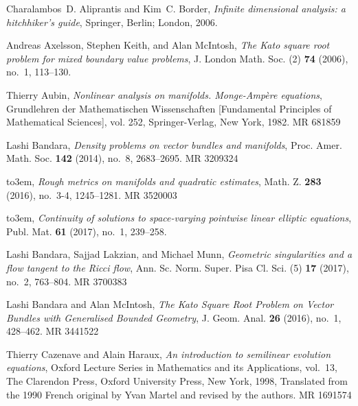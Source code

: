 \providecommand{\bysame}{\leavevmode\hbox to3em{\hrulefill}\thinspace}
\providecommand{\MR}{\relax\ifhmode\unskip\space\fi MR }
\providecommand{\MRhref}[2]{%
  \href{http://www.ams.org/mathscinet-getitem?mr=#1}{#2}
}
\providecommand{\href}[2]{#2}
\begin{thebibliography}{AKM06}

Charalambos~D. Aliprantis and Kim~C. Border, \emph{Infinite dimensional
  analysis: a hitchhiker's guide}, Springer, Berlin; London, 2006.

Andreas Axelsson, Stephen Keith, and Alan McIntosh, \emph{The {K}ato square
  root problem for mixed boundary value problems}, J. London Math. Soc. (2)
  \textbf{74} (2006), no.~1, 113--130.

Thierry Aubin, \emph{Nonlinear analysis on manifolds. {M}onge-{A}mp\`ere
  equations}, Grundlehren der Mathematischen Wissenschaften [Fundamental
  Principles of Mathematical Sciences], vol. 252, Springer-Verlag, New York,
  1982. \MR{681859}

Lashi Bandara, \emph{Density problems on vector bundles and manifolds}, Proc.
  Amer. Math. Soc. \textbf{142} (2014), no.~8, 2683--2695. \MR{3209324}

\bysame, \emph{Rough metrics on manifolds and quadratic estimates}, Math. Z.
  \textbf{283} (2016), no.~3-4, 1245--1281. \MR{3520003}

\bysame, \emph{Continuity of solutions to space-varying pointwise linear
  elliptic equations}, Publ. Mat. \textbf{61} (2017), no.~1, 239--258.

Lashi Bandara, Sajjad Lakzian, and Michael Munn, \emph{Geometric singularities
  and a flow tangent to the {R}icci flow}, Ann. Sc. Norm. Super. Pisa Cl. Sci.
  (5) \textbf{17} (2017), no.~2, 763--804. \MR{3700383}

Lashi Bandara and Alan McIntosh, \emph{The {K}ato {S}quare {R}oot {P}roblem on
  {V}ector {B}undles with {G}eneralised {B}ounded {G}eometry}, J. Geom. Anal.
  \textbf{26} (2016), no.~1, 428--462. \MR{3441522}

Thierry Cazenave and Alain Haraux, \emph{An introduction to semilinear
  evolution equations}, Oxford Lecture Series in Mathematics and its
  Applications, vol.~13, The Clarendon Press, Oxford University Press, New
  York, 1998, Translated from the 1990 French original by Yvan Martel and
  revised by the authors. \MR{1691574}


\end{thebibliography}
